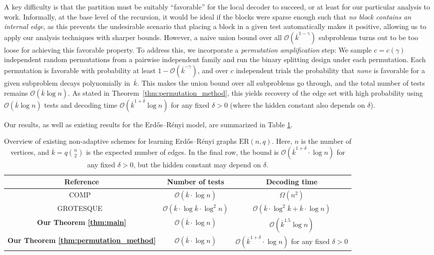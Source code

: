 \documentclass[journal]{IEEEtran}
\theoremstyle{definition}
\theoremstyle{definition}
\newcommand{\ER}{\mathrm{ER}}
\newcommand{\kb}{\overline{k}}
\newcommand{\bigO}{\mathcal{O}}
\begin{document}
A key difficulty is that the partition must be suitably ``favorable'' for the local decoder to succeed, or at least for our particular analysis to work.  Informally, at the base level of the recursion,
it would be ideal if the blocks were sparse enough such that \emph{no block contains an internal edge}, as this prevents the undesirable scenario that placing a block in a given test automatically makes it positive, allowing us to apply our analysis techniques with sharper bounds.  
However, a naive union bound over all \(\bigO(\kb^{1-\gamma})\) subproblems turns out to be too loose for achieving this favorable property. To address this, we incorporate a
\emph{permutation amplification} step: We sample \(c=c(\gamma)\) independent random permutations from a pairwise independent family and run the
binary splitting design under each permutation. Each permutation is favorable with probability at least \(1 - \bigO(\kb^{-\gamma})\), and over \(c\) independent trials the probability that \emph{none} is favorable for a given subproblem decays polynomially in~\(\kb\). This makes the union bound over all subproblems go through, %
and the total number of tests remains
\(\bigO(\kb\log n)\). As stated in Theorem~\ref{thm:permutation_method}, this yields recovery of the edge set with high probability using \(\bigO(\kb\log n)\) tests and decoding time \(\bigO(\kb^{1+\delta}\log n)\) for any fixed \(\delta>0\) (where the hidden constant also depends on $\delta$).
\par 
Our results, as well as existing results for the Erd\H{o}s--R\'enyi  model, are summarized in Table \ref{tab:results}.

\begin{table}[t]
  \centering
  \begin{tabular}{|c|c|c|}
    \hline
    \textbf{Reference} & \textbf{Number of tests} & \textbf{Decoding time} \\ \hline
    COMP~\cite{li2019learning} & $\bigO(\kb \cdot \log n)$ & $\Omega(n^2)$ \\ \hline
    GROTESQUE~\cite{li2019learning} & $\bigO(\kb \cdot \log \kb \cdot \log^2 n)$ & $\bigO(\kb \cdot \log^2 \kb + \kb \cdot \log n)$ \\ \hline
    {\bf Our Theorem \ref{thm:main}} & $\bigO(\kb \cdot \log n)$ & $\bigO(\kb^{1.5} \log n)$\footnotemark \\ \hline
    {\bf Our Theorem \ref{thm:permutation_method}} & $\bigO(\kb \cdot \log n)$ & $\bigO(\kb^{1+\delta} \cdot \log n)$ for any fixed $\delta>0$ \\ \hline
  \end{tabular}
   \vspace{0.5em}
  \caption{Overview of existing non-adaptive schemes for learning Erd\H{o}s--R\'enyi graphs $\ER(n,q)$. Here, $n$ is the number of vertices, and $\kb = q\binom{n}{2}$ is the expected number of edges. In the final row, the bound is \(\bigO(\kb^{1+\delta} \cdot \log n)\) for any fixed $\delta > 0$, but the hidden constant may depend on \(\delta\).}
  \label{tab:results}
\end{table}
\end{document}
